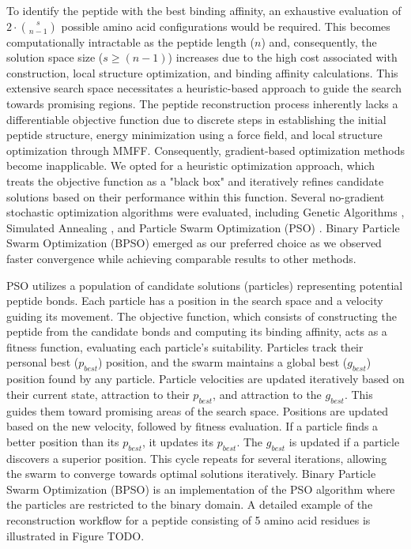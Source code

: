 \vspace{3pt} \noindent
To identify the peptide with the best binding affinity, an exhaustive evaluation of $2 \cdot {s \choose n-1}$ possible amino acid configurations would be required. This becomes computationally intractable as the peptide length ($n$) and, consequently, the solution space size ($s \geq (n-1)$) increases due to the high cost associated with construction, local structure optimization, and binding affinity calculations. This extensive search space necessitates a heuristic-based approach to guide the search towards promising regions. The peptide reconstruction process inherently lacks a differentiable objective function due to discrete steps in establishing the initial peptide structure, energy minimization using a force field, and local structure optimization through MMFF. Consequently, gradient-based optimization methods become inapplicable. We opted for a heuristic optimization approach, which treats the objective function as a "black box" and iteratively refines candidate solutions based on their performance within this function. Several no-gradient stochastic optimization algorithms were evaluated, including Genetic Algorithms \cite{holland1992adaptation}, Simulated Annealing \cite{kirkpatrick1983optimization}, and Particle Swarm Optimization (PSO) \cite{eberhart1995new, kennedy1995particle}. Binary Particle Swarm Optimization (BPSO) emerged as our preferred choice as we observed faster convergence while achieving comparable results to other methods. 

\vspace{3pt} \noindent
PSO utilizes a population of candidate solutions (particles) representing potential peptide bonds. Each particle has a position in the search space and a velocity guiding its movement. The objective function, which consists of constructing the peptide from the candidate bonds and computing its binding affinity, acts as a fitness function, evaluating each particle's suitability. Particles track their personal best ($p_{best}$) position, and the swarm maintains a global best ($g_{best}$) position found by any particle. Particle velocities are updated iteratively based on their current state, attraction to their $p_{best}$, and attraction to the $g_{best}$. This guides them toward promising areas of the search space. Positions are updated based on the new velocity, followed by fitness evaluation. If a particle finds a better position than its $p_{best}$, it updates its $p_{best}$. The $g_{best}$ is updated if a particle discovers a superior position. This cycle repeats for several iterations, allowing the swarm to converge towards optimal solutions iteratively. Binary Particle Swarm Optimization (BPSO) is an implementation of the PSO algorithm where the particles are restricted to the binary domain. A detailed example of the reconstruction workflow for a peptide consisting of 5 amino acid residues is illustrated in Figure TODO.

